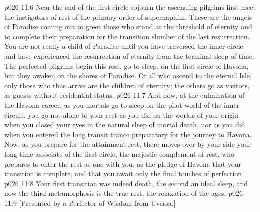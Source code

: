 \vs p026 11:6 \pc Near the end of the first\hyp{}circle sojourn the ascending pilgrims first meet the instigators of rest of the primary order of supernaphim. These are the angels of Paradise coming out to greet those who stand at the threshold of eternity and to complete their preparation for the transition slumber of the last resurrection. You are not really a child of Paradise until you have traversed the inner circle and have experienced the resurrection of eternity from the terminal sleep of time. The perfected pilgrims begin this rest, go to sleep, on the first circle of Havona, but they awaken on the shores of Paradise. Of all who ascend to the eternal Isle, only those who thus arrive are the children of eternity; the others go as visitors, as guests without residential status.
\vs p026 11:7 And now, at the culmination of the Havona career, as you mortals go to sleep on the pilot world of the inner circuit, you go not alone to your rest as you did on the worlds of your origin when you closed your eyes in the natural sleep of mortal death, nor as you did when you entered the long transit trance preparatory for the journey to Havona. Now, as you prepare for the attainment rest, there moves over by your side your long\hyp{}time associate of the first circle, the majestic complement of rest, who prepares to enter the rest as one with you, as the pledge of Havona that your transition is complete, and that you await only the final touches of perfection.
\vs p026 11:8 Your first transition was indeed death, the second an ideal sleep, and now the third metamorphosis is the true rest, the relaxation of the ages.
\vsetoff
\vs p026 11:9 [Presented by a Perfector of Wisdom from Uversa.]
\quizlink
